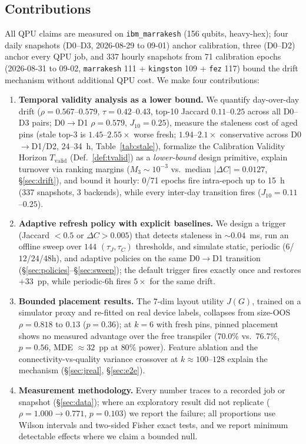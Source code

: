 \documentclass[journal,10pt,twocolumn]{IEEEtran}
\begin{document}
\subsection{Contributions}
All QPU claims are measured on \texttt{ibm\_marrakesh} (156 qubits, heavy-hex);
four daily snapshots (D0--D3, 2026-08-29 to 09-01) anchor calibration, three (D0--D2) anchor every QPU job,
and 337 hourly snapshots from 71 calibration epochs (2026-08-31 to 09-02,
\texttt{marrakesh} 111 + \texttt{kingston} 109 + \texttt{fez} 117) bound the drift mechanism without additional
QPU cost. We make four contributions:
\begin{enumerate}[leftmargin=1.8em,itemsep=1pt,topsep=2pt]
\item \textbf{Temporal validity analysis as a lower bound.} We quantify day-over-day drift
($\rho{=}0.567$--$0.579$, $\tau{=}0.42$--$0.43$, top-10 Jaccard $0.11$--$0.25$ across all D0--D3 pairs; D0$\to$D1 $\rho{=}0.579$, $J_{10}{=}0.25$),
measure the staleness cost of aged pins
(stale top-3 is $1.45$--$2.55\times$ worse fresh; $1.94$--$2.1\times$ conservative across D0$\to$D1/D2, 24--34~h,
Table~\ref{tab:stale}), formalize
the Calibration Validity Horizon $T_{\mathrm{valid}}$ (Def.~\ref{def:tvalid}) as a
\emph{lower-bound} design primitive, explain turnover via ranking margins
($M_3\sim10^{-3}$ vs.\ median $|\Delta C|=0.0127$, \S\ref{sec:drift}), and bound it hourly:
0/71 epochs fire intra-epoch up to 15~h (337 snapshots, 3 backends), while every inter-day transition fires
($J_{10}{=}0.11$--$0.25$).
\item \textbf{Adaptive refresh policy with explicit baselines.} We design a trigger
(Jaccard $<0.5$ or $\Delta C{>}0.005$) that detects staleness in $\sim0.04$~ms, run an offline sweep over
$144$ $(\tau_J,\tau_C)$ thresholds, and simulate static, periodic ($6$/$12$/$24$/$48$h), and adaptive
policies on the same D0$\to$D1 transition (\S\ref{sec:policies}--\S\ref{sec:sweep}); the default trigger
fires exactly once and restores $+33$~pp, while periodic-$6$h fires $5\times$ for the same drift.
\item \textbf{Bounded placement results.} The 7-dim layout utility $J(G)$, trained on a simulator proxy and
re-fitted on real device labels, collapses from size-OOS $\rho{=}0.818$ to $0.13$
($p{=}0.36$); at $k{=}6$ with fresh pins, pinned placement shows no measured advantage over the
free transpiler ($70.0\%$ vs.\ $76.7\%$, $p{=}0.56$, MDE $\approx32$~pp at $80\%$ power). Feature ablation
and the connectivity-vs-quality variance crossover at $k\approx100$--$128$ explain the mechanism
(\S\ref{sec:jreal}, \S\ref{sec:e2e}).
\item \textbf{Measurement methodology.} Every number traces to a recorded job or snapshot
(\S\ref{sec:data}); where an exploratory result did not replicate ($\rho{=}1.000\to0.771$, $p{=}0.103$)
we report the failure; all proportions use Wilson intervals and two-sided Fisher exact tests, and we
report minimum detectable effects where we claim a bounded null.
\end{enumerate}
\end{document}
